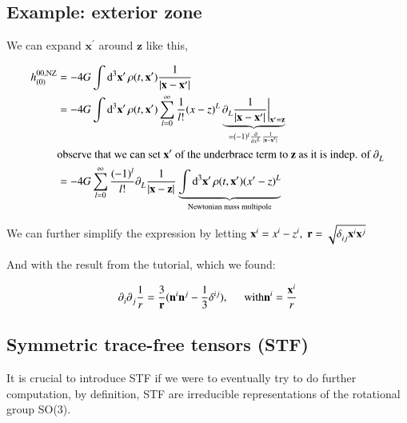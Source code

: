 \documentclass[a4paper, 12pt]{article}
\begin{document}
 \subsection{Example: exterior zone}%
  \label{sub:Example: exterior zone}
  
  We can expand \(  \textbf{x}^{\prime} \) around \( \textbf{z} \) like
  this, 

  \begin{align}
    \label{expand exterior zone}
    h_{(0)}^{00, \mathrm{NZ}} &= -4G \int
    \dd[3]{\textbf{x}^{\prime}} \rho ( t, \textbf{x}^{\prime} ) \frac{1}{
    | \textbf{x} - \textbf{x}^{\prime} |^{} } \\ 
    &= - 4G \int \dd[3]{\textbf{x}^{\prime}} \rho(t,
    \textbf{x}^{\prime})   \sum_{l = 0}^{\infty} \frac{1}{l!} (x-z)^L
    \underbrace{\partial_{L}^{}  \frac{1}{
    | \textbf{x} - \textbf{x}^{\prime} |^{} }
    \bigg|_{\textbf{x}^{\prime} = \textbf{z}} }_{= (-1)^l \frac{\partial
    }{\partial x^L} \frac{1}{| \textbf{x} - \textbf{x}^{\prime} |^{} }}\\ 
    &\textnormal{observe that we can set } \textbf{x}^{\prime}
    \textnormal{ of the underbrace term to } \textbf{z}
    \textnormal{ as it is indep. of } \partial_{L}^{} \\ 
    &= -4G \sum_{l=0}^{\infty} \frac{(-1)^l}{l!} \partial_{L}^{}
    \frac{1}{| \textbf{x} - \textbf{z} |^{} } \underbrace{\int
    \dd[3]{\textbf{x}^{\prime}} \rho(t,
    \textbf{x}^{\prime}) (x^{\prime} - z)^L}_{\textrm{Newtonian mass
    multipole}} 
  \end{align}

We can further simplify the expression by letting \( \textbf{x}^i
= x^i - z^i, \hspace{0.1cm} \textbf{r}  = \sqrt{\delta_{ij}^{} \textbf{x}^i
\textbf{x}^j}   \)


And with the result from the tutorial, which we found: 

\begin{align}
  \label{double derivative on 1/r}
  \partial_{i}^{}\partial_{j}^{} \frac{1}{r } =
  \frac{3}{\textbf{r}} ( \textbf{n}^i \textbf{n}^j - \frac{1}{3} \delta_{
  }^{ij} ), \hspace{0.5cm} \mathrm{with } \textbf{n}^i =
  \frac{\textbf{x}^i}{r}
\end{align}

\subsection{Symmetric trace-free tensors (STF)}%
  \label{sub:Symmetric trace-free tensors (STF)}
 It is crucial to introduce STF if we were to eventually try to do further
 computation, by definition, STF are irreducible representations of the
 rotational group  SO(3).
\end{document}
